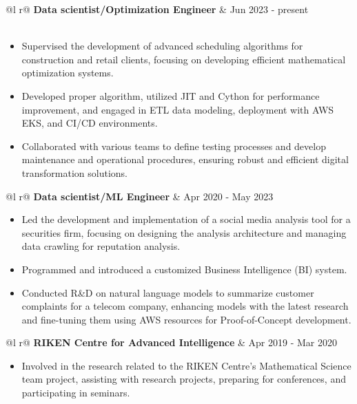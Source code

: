 \documentclass[a4paper,12pt]{article}
\begin{document}
\begin{tabularx}{\linewidth}{ @{}l r@{} }
\textbf{Data scientist/Optimization Engineer} & \hfill Jun 2023 - present \\[3.75pt]
  \\
\end{tabularx}
\begin{itemize}
\item Supervised the development of advanced scheduling algorithms for construction and retail clients, focusing on developing efficient mathematical optimization systems.  

\item Developed proper algorithm, utilized JIT and Cython for performance improvement, and engaged in ETL data modeling, deployment with AWS EKS, and CI/CD environments.  

\item Collaborated with various teams to define testing processes and develop maintenance and operational procedures, ensuring robust and efficient digital transformation solutions.
\end{itemize}

\begin{tabularx}{\linewidth}{ @{}l r@{} }
\textbf{Data scientist/ML Engineer} & \hfill Apr 2020 - May 2023 \\[3.75pt]
\end{tabularx}
\begin{itemize}
\item Led the development and implementation of a social media analysis tool for a securities firm, focusing on designing the analysis architecture and managing data crawling for reputation analysis.  

\item Programmed and introduced a customized Business Intelligence (BI) system. 

\item Conducted R\&D on natural language models to summarize customer complaints for a telecom company, enhancing models with the latest research and fine-tuning them using AWS resources for Proof-of-Concept development.
\end{itemize}
\begin{tabularx}{\linewidth}{ @{}l r@{} }
\textbf{RIKEN Centre for Advanced Intelligence} & \hfill Apr 2019 - Mar 2020 \\[3.75pt]
\end{tabularx}
\begin{itemize}
\item Involved in the research related to the RIKEN Centre’s Mathematical Science team project, assisting with research projects, preparing for conferences, and participating in seminars. 
\end{itemize}
\end{document}
